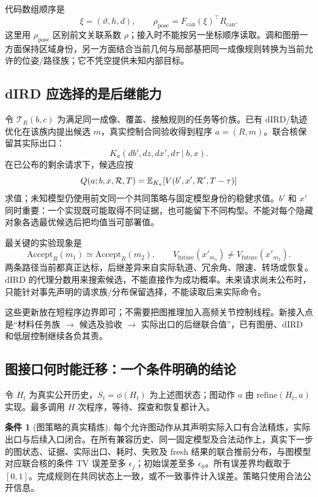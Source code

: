 \documentclass[11pt,a4paper,fontset=fandol]{ctexart}
\theoremstyle{definition}
\newtheorem{assumption}[theorem]{条件}
\theoremstyle{remark}\newtheorem{remark}[theorem]{说明}
\numberwithin{equation}{section}
\begin{document}
代码数组顺序是
\begin{equation}
 \xi=(\vartheta,h,d),\qquad
 \rho_{\mathrm{pose}}=F_{\mathrm{can}}(\xi)^\top R_{\mathrm{can}}.
\end{equation}
这里用 $\rho_{\mathrm{pose}}$ 区别前文关联系数 $\rho$；接入时不能按另一坐标顺序读取。调和图册一方面保持区域身份，另一方面结合当前几何与局部基把同一成像规则转换为当前允许的位姿/路径族；它不凭空提供未知内部目标。

\subsection{dIRD 应选择的是后继能力}
令 $\mathcal T_R(b,c)$ 为满足同一成像、覆盖、接触规则的任务等价族。已有 dIRD/轨迹优化在该族内提出候选 $m$，真实控制合同验收得到程序 $a=(R,m)$。联合核保留其实际出口：
\begin{equation}
 K_a(db',dz,dx',d\tau\mid b,x).
\end{equation}
在已公布的剩余请求下，候选应按
\begin{equation}
 Q(a;b,x,\mathcal R,T)
 =\mathbb E_{K_a}\!\left[
 V(b',x',\mathcal R',T-\tau)\right]
 \label{eq:successor_graph}
\end{equation}
求值；未知模型仍使用前文同一个共同策略与固定模型身份的稳健求值。$b'$ 和 $x'$ 同时重要：一个实现既可能取得不同证据，也可能留下不同构型。不能对每个隐藏对象各选最优候选后把均值当可部署值。

最关键的实验现象是
\begin{equation}
 \mathrm{Accept}_{R}(m_1)\simeq\mathrm{Accept}_{R}(m_2),
 \qquad
 V_{\mathrm{future}}(x'_{m_1})
 \ne V_{\mathrm{future}}(x'_{m_2}).
\end{equation}
两条路径当前都真正达标，后继差异来自实际轨道、冗余角、限速、转场或恢复。dIRD 的代理分数用来搜索候选，不能直接作为成功概率。未来请求尚未公布时，只能针对事先声明的请求族/分布保留选择，不能读取后来实际命令。

这些更新放在短程序边界即可；不需要把图推理加入高频关节控制线程。新接入点是“材料任务族 $\to$ 候选及验收 $\to$ 实际出口的后继联合值”，已有图册、dIRD 和低层控制继续各负其责。

\subsection{图接口何时能迁移：一个条件明确的结论}
令 $H_t$ 为真实公开历史，$S_t=\phi(H_t)$ 为上述图状态；图动作 $a$ 由 $\mathrm{refine}(H_t,a)$ 实现。最多调用 $H$ 次程序，等待、探查和恢复都计入。
\begin{assumption}[图策略的真实精炼]
\label{ass:graph_refine}
每个允许图动作从其声明实际入口有合法精炼，实际出口与后续入口闭合。在所有兼容历史、同一固定模型及合法动作上，真实下一步的图状态、证据、实际出口、耗时、失败及 fresh 结果的联合推前分布，与图模型对应联合核的条件 TV 误差至多 $\epsilon_j$；初始误差至多 $\epsilon_0$。所有误差界均截取于 $[0,1]$。完成规则在共同状态上一致，或不一致事件计入误差。策略只使用合法公开信息。
\end{assumption}
\end{document}
